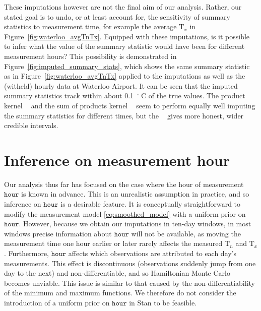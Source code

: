 \documentclass[letter]{article}
\newcommand{\T}{\mathrm{T}}
\newcommand{\Tn}{\T_{n}}
\newcommand{\Tx}{\T_{x}}
\newcommand{\degreeC}{{}^{\circ}~\mathrm{C}}
\newcommand{\hour}{\mathtt{hour}}
\DeclareMathOperator{\kSESE}{k_{\mathtt{SExSE}}}
\DeclareMathOperator{\ksumprod}{k_{\mathtt{sumprod}}}
\begin{document}
        These imputations however are not the final aim of our analysis.
Rather, our stated goal is to undo, or at least account for, the sensitivity of summary statistics to measurement time, for example the average \(\Tx\) in Figure~\ref{fig:waterloo_avgTnTx}.
Equipped with these imputations, is it possible to infer what the value of the summary statistic would have been for different measurement hours?
This possibility is demonstrated in Figure~\ref{fig:imputed_summary_stats},
which shows the same summary statistic as in Figure~\ref{fig:waterloo_avgTnTx} applied to the imputations as well as the (witheld) hourly data at Waterloo Airport.
It can be seen that the imputed summary statistics track within about 0.1~\(\degreeC\) of the true values.
The product kernel \(\kSESE\) and the sum of products kernel \(\ksumprod\) seem to perform equally well imputing the summary statistics for different times, but the \(\ksumprod\) gives more honest, wider credible intervals.

        \section{Inference on measurement hour}\label{inference-on-measurement-hour}

Our analysis thus far has focused on the case where the hour of measurement \(\hour\) is known in advance.
This is an unrealistic assumption in practice, and so inference on \(\hour\) is a desirable feature.
It is conceptually straightforward to modify the measurement model \eqref{eq:smoothed_model} with a uniform prior on \(\hour\).
However, because we obtain our imputations in ten-day windows, in most windows precise information about \(\hour\) will not be available, as moving the measurement time one hour earlier or later rarely affects the measured \(\Tn\) and \(\Tx\).
Furthermore, \(\hour\) affects which observations are attributed to each day's measurements.
This effect is discontinuous (observations suddenly jump from one day to the next) and non-differentiable, and so Hamiltonian Monte Carlo becomes unviable.
This issue is similar to that caused by the non-differentiability of the minimum and maximum functions.
We therefore do not consider the introduction of a uniform prior on \(\hour\) in Stan to be feasible.
    
\end{document}
